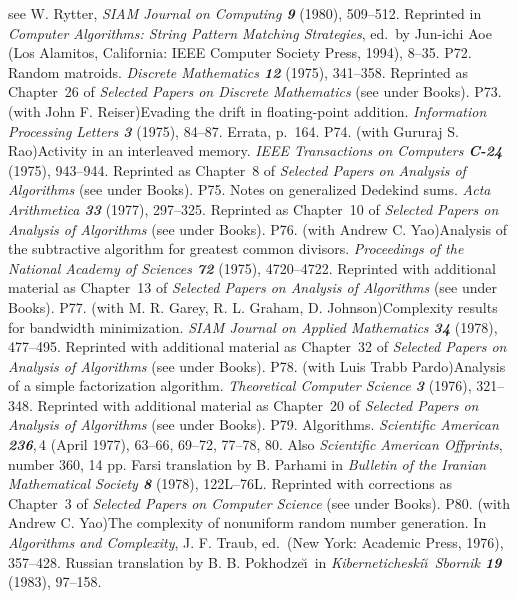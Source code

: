  see W. Rytter, {\sl SIAM Journal on Computing\/ \bf 9} (1980), 509--512.
 Reprinted in {\sl Computer Algorithms: String Pattern Matching Strategies},
 ed.~by Jun-ichi Aoe (Los Alamitos, California: IEEE Computer Society Press,
 1994), 8--35.
\p P72.  Random matroids.  {\sl Discrete Mathematics\/ \bf 12} (1975),
 341--358.  
 Reprinted as Chapter~26 of {\sl Selected Papers on
 Discrete Mathematics\/} (see under Books).
\p P73. (with John F. Reiser)\xskip  Evading the drift in floating-point
 addition. {\sl Information Processing Letters\/ \bf 3} (1975), 84--87.
 Errata, p.\ 164.
\p P74.  (with Gururaj S. Rao)\xskip  Activity in an interleaved memory.
 {\sl IEEE Transactions on Computers\/ \bf C-24} (1975), 943--944.  
 Reprinted as Chapter~8 of {\sl Selected Papers on Analysis of Algorithms\/}
 (see under Books).
\p P75.  Notes on generalized Dedekind sums.  {\sl Acta Arithmetica\/
 \bf 33} (1977), 297--325.
 Reprinted as Chapter~10 of {\sl Selected Papers on Analysis of Algorithms\/}
 (see under Books).
\p P76.  (with Andrew C. Yao)\xskip  Analysis of the subtractive algorithm
 for greatest common divisors.  {\sl Proceedings of the National Academy
 of Sciences\/ \bf 72} (1975), 4720--4722.  
 Reprinted with additional material as Chapter~13 of {\sl Selected Papers
 on Analysis of Algorithms\/} (see under Books).
\p P77.  (with M. R. Garey, R. L. Graham, D. Johnson)\xskip  Complexity
 results for bandwidth minimization.  {\sl SIAM Journal on Applied
 Mathematics\/ \bf 34} (1978), 477--495.
 Reprinted with additional material as Chapter~32 of {\sl Selected Papers
 on Analysis of Algorithms\/} (see under Books).
\p P78.  (with Luis Trabb Pardo)\xskip  Analysis of a simple factorization
 algorithm.  {\sl Theoretical Computer Science\/ \bf 3} (1976), 321--348.  
 Reprinted with additional material as Chapter~20 of {\sl Selected Papers
 on Analysis of Algorithms\/} (see under Books).
\p P79.  Algorithms.  {\sl Scientific American\/ \bf236},\,4 (April 1977),
 63--66, 69--72, 77--78, 80.
 Also {\sl Scientific American Offprints}, number 360, 14 pp.
 Farsi translation by B. Parhami in {\sl Bulletin of the
  Iranian Mathematical Society\/ \bf 8} (1978), 122L--76L.  
 Reprinted with corrections as Chapter~3 of {\sl Selected Papers on
 Computer Science\/} (see under Books).
\p P80.  (with Andrew C. Yao)\xskip  The complexity of nonuniform random
 number generation.  In {\sl Algorithms and Complexity},
 J. F. Traub, ed.\ (New York:  Academic Press, 1976), 357--428.
 Russian translation by B. B. Pokhodze\u\i\ in {\sl Kiberneticheski\u\i\
 Sbornik\/ \bf 19} (1983), 97--158.
